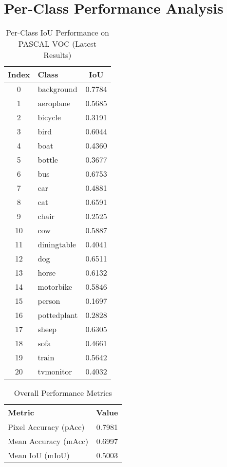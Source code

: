 \section{Per-Class Performance Analysis}
\label{subsec:per_class_performance}
\begin{table}[ht]
\centering
\caption{Per-Class IoU Performance on PASCAL VOC (Latest Results)}
\begin{tabular}{|c|l|c|}
\hline
\textbf{Index} & \textbf{Class}      & \textbf{IoU} \\ \hline
0  & background   & 0.7784  \\
1  & aeroplane    & 0.5685  \\
2  & bicycle      & 0.3191  \\
3  & bird         & 0.6044  \\
4  & boat         & 0.4360  \\
5  & bottle       & 0.3677  \\
6  & bus          & 0.6753  \\
7  & car          & 0.4881  \\
8  & cat          & 0.6591  \\
9  & chair        & 0.2525  \\
10 & cow          & 0.5887  \\
11 & diningtable  & 0.4041  \\
12 & dog          & 0.6511  \\
13 & horse        & 0.6132  \\
14 & motorbike    & 0.5846  \\
15 & person       & 0.1697  \\
16 & pottedplant  & 0.2828  \\
17 & sheep        & 0.6305  \\
18 & sofa         & 0.4661  \\
19 & train        & 0.5642  \\
20 & tvmonitor    & 0.4032  \\ \hline
\end{tabular}
\end{table}

\begin{table}[ht]
\centering
\caption{Overall Performance Metrics}
\begin{tabular}{|l|c|}
\hline
\textbf{Metric} & \textbf{Value} \\ \hline
Pixel Accuracy (pAcc) & 0.7981 \\
Mean Accuracy (mAcc)  & 0.6997 \\
Mean IoU (mIoU)       & 0.5003 \\ \hline
\end{tabular}
\end{table}

